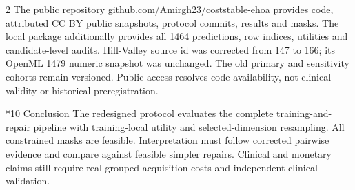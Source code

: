 \documentclass[10pt,a4paper]{article}
\makeatletter
\renewcommand{\section}{\@startsection{section}{1}{0pt}{5pt}{2pt}{\normalfont\normalsize\bfseries}}
\newcommand{\sect}[1]{\section*{#1}}
\makeatother
\begin{document}
\begin{multicols}{2}
The public repository github.com/Amirgh23/coststable-ehoa provides code, attributed CC BY public snapshots, protocol commits, results and masks. The local package additionally provides all 1464 predictions, row indices, utilities and candidate-level audits. Hill-Valley source id was corrected from 147 to 166; its OpenML 1479 numeric snapshot was unchanged. The old primary and sensitivity cohorts remain versioned. Public access resolves code availability, not clinical validity or historical preregistration.

\sect{10  Conclusion}
The redesigned protocol evaluates the complete training-and-repair pipeline with training-local utility and selected-dimension resampling. All constrained masks are feasible. Interpretation must follow corrected pairwise evidence and compare against feasible simpler repairs. Clinical and monetary claims still require real grouped acquisition costs and independent clinical validation.


\end{multicols}
\end{document}
